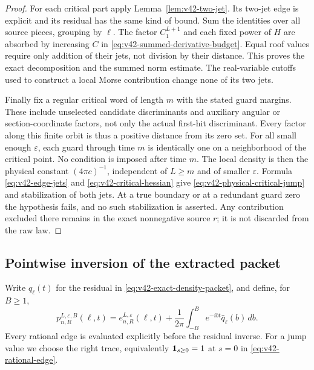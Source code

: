 \begin{proof}
For each critical part apply Lemma~\ref{lem:v42-two-jet}. Its two-jet
edge is explicit and its residual has the same kind of bound. Sum the
identities over all source pieces, grouping by $\ell$. The factor
$C_1^{L+1}$ and each fixed power of $H$ are absorbed by increasing
$C$ in \eqref{eq:v42-summed-derivative-budget}. Equal roof values
require only addition of their jets, not division by their distance.
This proves the exact decomposition and the summed norm estimate.
The real-variable cutoffs used to construct a local Morse contribution
change none of its two jets.

Finally fix a regular critical word of length $m$ with the stated
guard margins. These include unselected candidate discriminants and
auxiliary angular or section-coordinate factors, not only the actual
first-hit discriminant. Every factor along this finite orbit is thus
a positive distance from its zero set.
For all small enough $\varepsilon$, each guard through time $m$ is
identically one on a neighborhood of the critical point. No condition
is imposed after time $m$. The local density is then the physical
constant $(4\pi c)^{-1}$, independent of $L\ge m$ and of smaller
$\varepsilon$. Formula \eqref{eq:v42-edge-jets} and
\eqref{eq:v42-critical-hessian} give
\eqref{eq:v42-physical-critical-jump} and stabilization of both jets.
At a true boundary or at a redundant guard zero the hypothesis fails,
and no such stabilization is asserted. Any contribution excluded there
remains in the exact nonnegative source $r$; it is not discarded from
the raw law.
\end{proof}

\subsection{Pointwise inversion of the extracted packet}
Write $q_\ell(t)$ for the residual in
\eqref{eq:v42-exact-density-packet}, and define, for $B\ge1$,
\begin{equation}\label{eq:v42-pointwise-packet-inverse}
 p^{L,\varepsilon,B}_{n,R}(\ell,t)
    =e_{n,R}^{L,\varepsilon}(\ell,t)
          +\frac1{2\pi}\int_{-B}^{B}e^{-ibt}\widehat q_\ell(b)\,db.
\end{equation}
Every rational edge is evaluated explicitly before the residual inverse.
For a jump value we choose the right trace, equivalently
$\mathbf1_{s\ge0}=1$ at $s=0$ in \eqref{eq:v42-rational-edge}.

